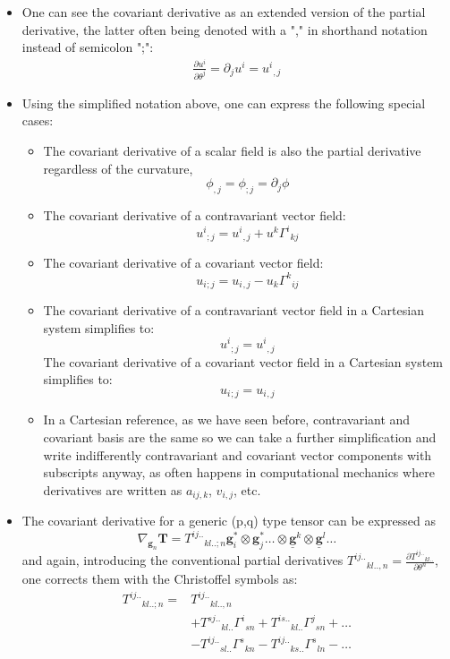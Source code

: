 \documentclass{digitaldynamics}
\def\vect#1{\bm{#1}}
\def\vcovar#1{{\bm{#1}}^*}
\def\vcontr#1{\underline{\bm{#1}}}
\def\tensor#1{\bm{#1}}
\begin{document}
\begin{itemize}
	
	\item One can see the covariant derivative as an extended version of the partial derivative, the latter often being denoted with a "," in shorthand
	notation instead of semicolon ";": 
	\begin{align}
	  \frac{\partial u^i}{\partial \theta^j} = \partial_j u^i = u^i{}_{,j} 
	\label{eq:partialderivative}
	\end{align}
	
	
	
	
	\item Using the simplified notation above, one can express the following special cases:
	
	\begin{itemize}
		\item The covariant derivative of a scalar field is also the partial derivative regardless of the curvature,
		\[
		   \phi_{,j} = \phi_{;j} =  \partial_j \phi  
		\]
			
		\item The covariant derivative of a contravariant vector field:
		\[
		   {u}^i{}_{;j} = u^i{}_{,j} + u^k {\Gamma^i}_{kj} 
		\]
		
		\item The covariant derivative of a covariant vector field:
		\[
		   {u}_i{}_{;j} = u_i{}_{,j} -  u_k {\Gamma^k}_{ij}
		\]
		
		\item The covariant derivative of a contravariant vector field in a Cartesian system simplifies to:
		\[
		   {u}^i{}_{;j} = u^i{}_{,j} 
		\]
		The covariant derivative of a covariant vector field in a Cartesian system simplifies to:
		\[
		   {u}_i{}_{;j} = u_i{}_{,j} 
		\]
		
		\item In a Cartesian reference, as we have seen before, contravariant and covariant basis are the same so we 
		can take a further simplification and write indifferently contravariant and covariant vector components with
		subscripts anyway, as often happens in computational mechanics where derivatives are written as $a_{ij,k}$, $v_{i,j}$, etc.
		
	\end{itemize}
	
	\item The covariant derivative for a generic (p,q) type tensor can be expressed as
	\[
		 \nabla_{\vect{g}_n} \tensor{T} = T^{ij..}{}_{kl.. ;n} \vcovar{g}_i \otimes \vcovar{g}_j \ldots \otimes \vcontr{g}^k \otimes \vcontr{g}^l \ldots
	\]
	and again, introducing the conventional partial derivatives $T^{ij..}{}_{kl.. ,n} = \frac{\partial T^{ij..}{}_{kl..} }{\partial \theta^n}$, one corrects them with the Christoffel symbols as:
	\begin{align}
	T^{ij..}{}_{kl.. ;n} =& T^{ij..}{}_{kl.. ,n} \\%
	 &+ T^{sj..}{}_{kl..} {\Gamma^i}_{sn} 
	 + T^{is..}{}_{kl..} {\Gamma^j}_{sn} 
	 + \ldots \\
	 &- T^{ij..}{}_{sl..} {\Gamma^s}_{kn} 
	 - T^{ij..}{}_{ks..} {\Gamma^s}_{ln} 
	 - \ldots
	\end{align}
	

\end{itemize}
\end{document}

